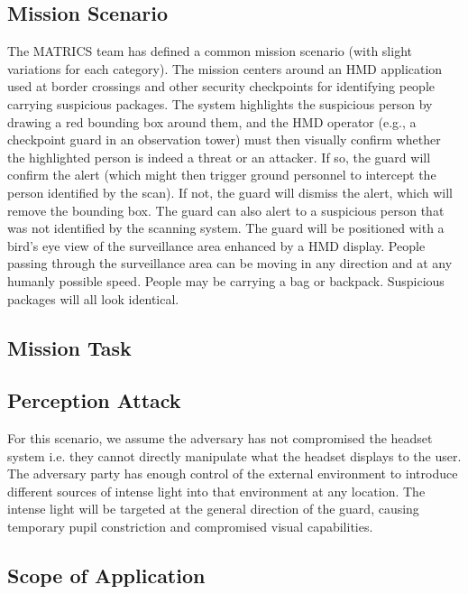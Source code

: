 
\subsection{Mission Scenario}

The MATRICS team has defined a common mission scenario (with slight variations for each category). The mission centers around an HMD application used at border crossings and other security checkpoints for identifying people carrying suspicious packages.  The system highlights the suspicious person by drawing a red bounding box around them, and the HMD operator (e.g., a checkpoint guard in an observation tower) must then visually confirm whether the highlighted person is indeed a threat or an attacker.  If so, the guard will confirm the alert (which might then trigger ground personnel to intercept the person identified by the scan).  If not, the guard will dismiss the alert, which will remove the bounding box.  The guard can also alert to a suspicious person that was not identified by the scanning system. 
The guard will be positioned with a bird’s eye view of the surveillance area enhanced by a HMD display. 
People passing through the surveillance area can be moving in any direction and at any humanly possible speed. People may be carrying a bag or backpack.  Suspicious packages will all look identical.


\subsection{Mission Task}

\subsection{Perception Attack}

For this scenario, we assume the adversary has not compromised the headset system i.e. 
they cannot directly manipulate what the headset displays to the user. The adversary party has enough control of the external environment
to introduce different sources of intense light into that environment at any location.  The intense light 
will be targeted at the general direction of the guard, causing temporary pupil constriction and compromised visual 
capabilities. 

\subsection{Scope of Application}


